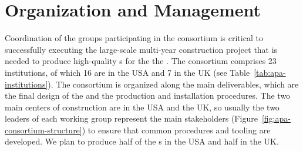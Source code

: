 \section{Organization and Management}
\label{sec:fdsp-apa-org}

Coordination of the groups participating in the   consortium is critical to successfully executing the large-scale multi-year construction project that is needed to produce high-quality s for the the  .   The  consortium comprises \num{23} institutions, of which \num{16} are in the USA and \num{7} in the UK (see Table~\ref{tab:apa-institutions}). The consortium is organized along the main deliverables, which are the final design of the  and the  production and installation procedures. The two main centers of  construction are in the USA and the UK, so usually the two leaders of each working group represent the main stakeholders (Figure~\ref{fig:apa-consortium-structure}) to ensure that common procedures and tooling are developed.  We plan to produce half of the  s in the USA and half in the UK.

